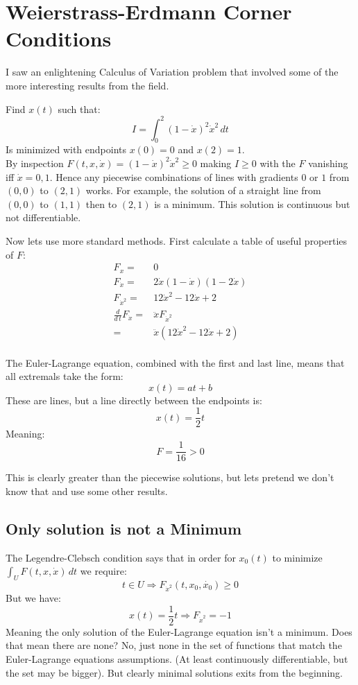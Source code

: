 
\section{Weierstrass-Erdmann Corner Conditions}
I saw an enlightening Calculus of Variation problem that involved some of the more interesting results from the field.

Find $x(t)$ such that:
\[I=\int_0^2(1-\dot{x})^2\dot{x}^2\,dt\]
Is minimized with endpoints $x(0)=0$ and $x(2)=1$.
\\

By inspection $F(t,x,\dot{x})=(1-\dot{x})^2\dot{x}^2\geq 0$ making $I\geq 0$ with the $F$ vanishing iff $\dot{x} = 0,1$.
Hence any piecewise combinations of lines with gradients $0$ or $1$ from $(0,0)$ to $(2,1)$ works.
For example,
the solution of a straight line from $(0,0)$ to $(1,1)$ then to $(2,1)$ is a minimum.
This solution is continuous but not differentiable.

Now lets use more standard methods.
First calculate a table of useful properties of $F$:
\begin{equation*}
\begin{aligned}
	F_x =& 0 \\
	F_{\dot{x}} =& 2\dot{x}(1-\dot{x})(1-2\dot{x})\\
	F_{\dot{x}^2} =& 12\dot{x}^2-12\dot{x}+2\\
	\frac{d}{d\,t}F_{\dot{x}} =& \ddot{x}F_{\dot{x}^2} \\
	=& \ddot{x}(12\dot{x}^2-12\dot{x}+2)\\
\end{aligned}
\end{equation*}

The Euler-Lagrange equation,
combined with the first and last line,
means that all extremals take the form:
\[x(t) = at+b\]
These are lines, 
but a line directly between the endpoints is:
\[x(t) = \frac{1}{2}t\]
Meaning:
\[F= \frac{1}{16}>0\]

This is clearly greater than the piecewise solutions,
but lets pretend we don't know that and use some other results. 
\\

\subsection{Only solution is not a Minimum}
The Legendre-Clebsch condition says that in order for $x_0(t)$ to minimize $\int_U F(t,x,\dot{x})\,dt$ we require:
\[ t\in U \Rightarrow F_{\dot{x}^2}(t,x_0,\dot{x_0}) \geq 0\]
But we have:
\[x(t)=\frac{1}{2}t \Rightarrow F_{\dot{x}^2} = -1\]
Meaning the only solution of the Euler-Lagrange equation isn't a minimum.
Does that mean there are none?
No, just none in the set of functions that match the Euler-Lagrange equations assumptions.
(At least continuously differentiable, but the set may be bigger).
But clearly minimal solutions exits from the beginning.

